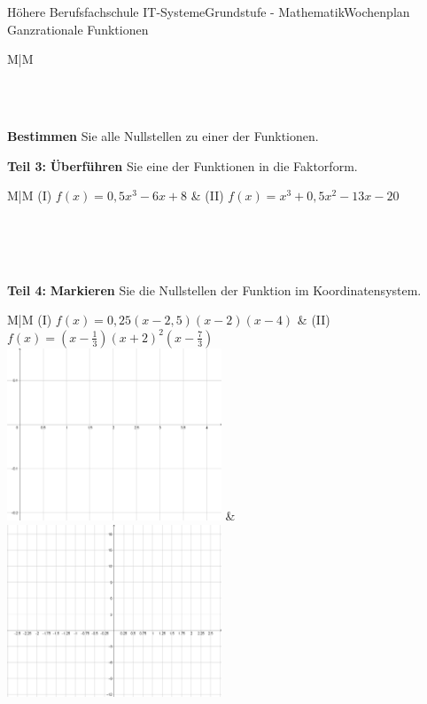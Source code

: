\documentclass[oneside,openany,headings=optiontotoc,11pt,numbers=noenddot]{scrreprt}
\begin{document}
\begin{worksheet}{Höhere Berufsfachschule IT-Systeme}{Grundstufe - Mathematik}{Wochenplan Ganzrationale Funktionen}
\begin{framed}
\begin{tabularx}{\textwidth}{M|M}
				\\
				\hline
				\\
			\end{tabularx}\\
			\par\noindent
			\textbf{Bestimmen} Sie alle Nullstellen zu einer der Funktionen.
		\end{framed}
		\normalsize
		\begin{framed}
			\noindent
			\textbf{Teil 3:} \textbf{Überführen} Sie eine der Funktionen in die Faktorform.\\
			\par\noindent
			\begin{tabularx}{\textwidth}{M|M}
				(I) \(f(x) = 0,5x^3-6x+8\) & (II) \(f(x) = x^3+0,5x^2-13x-20\)\\
				\\
				\hline
				\\
			\end{tabularx}\\
			\par\noindent
		\end{framed}
		\newpage
		\begin{framed}
			\noindent
			\textbf{Teil 4:} \textbf{Markieren} Sie die Nullstellen der Funktion im Koordinatensystem.\\
			\par\noindent
			\begin{tabularx}{\textwidth}{M|M}
				(I) \(f(x) = 0,25(x-2,5)(x-2)(x-4)\) & (II) \(f(x) = (x - \frac{1}{3})(x + 2)^2(x - \frac{7}{3})\)\\
				\includegraphics[width=0.48\textwidth,align=t]{../99_Bilder/WP/WP11_T3a.png} & \includegraphics[width=0.48\textwidth,align=t]{../99_Bilder/WP/WP11_T3b.png}\\

\end{tabularx}
\end{framed}
\end{worksheet}
\end{document}
